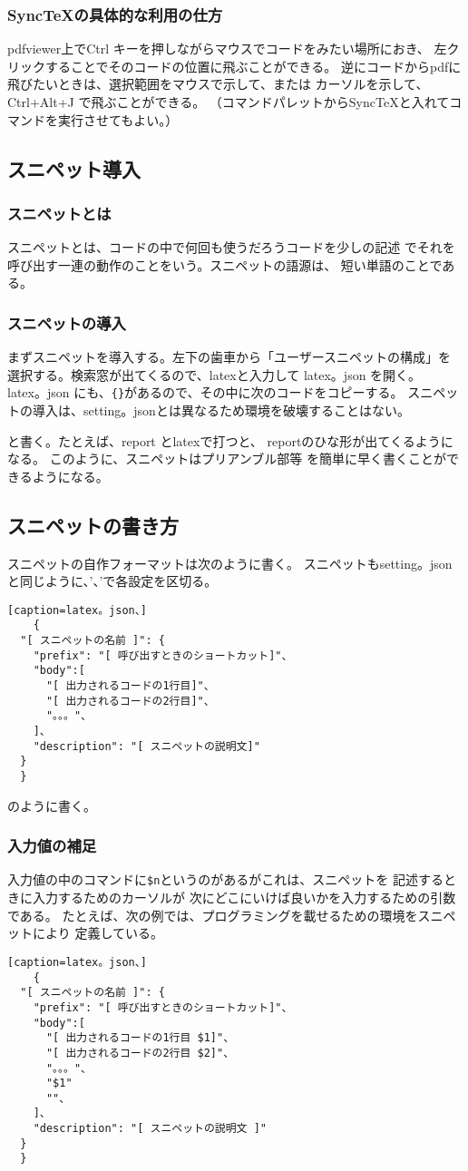 \documentclass{ltjsarticle}
\begin{document}
\subsubsection*{SyncTeXの具体的な利用の仕方}
pdfviewer上でCtrl キーを押しながらマウスでコードをみたい場所におき、
左クリックすることでそのコードの位置に飛ぶことができる。
逆にコードからpdfに飛びたいときは、選択範囲をマウスで示して、または
カーソルを示して、 Ctrl+Alt+J で飛ぶことができる。
（コマンドパレットからSyncTeXと入れてコマンドを実行させてもよい。）

\subsection{スニペット導入}
\subsubsection*{スニペットとは}
スニペットとは、コードの中で何回も使うだろうコードを少しの記述
でそれを呼び出す一連の動作のことをいう。スニペットの語源は、
短い単語のことである。
\subsubsection*{スニペットの導入}
まずスニペットを導入する。左下の歯車から「ユーザースニペットの構成」を
選択する。検索窓が出てくるので、latexと入力して latex。json を開く。
latex。json にも、\verb|{}|があるので、その中に次のコードをコピーする。
スニペットの導入は、setting。jsonとは異なるため環境を破壊することはない。



と書く。たとえば、report とlatexで打つと、
reportのひな形が出てくるようになる。
このように、スニペットはプリアンブル部等
を簡単に早く書くことができるようになる。
\subsection{スニペットの書き方}
スニペットの自作フォーマットは次のように書く。
スニペットもsetting。jsonと同じように、'、'で各設定を区切る。
\begin{verbatim}[caption=latex。json、]
	{
  "[ スニペットの名前 ]": {
    "prefix": "[ 呼び出すときのショートカット]"、
    "body":[
      "[ 出力されるコードの1行目]"、
      "[ 出力されるコードの2行目]"、
      "。。。"、
    ]、
    "description": "[ スニペットの説明文]"
  }
  }
\end{verbatim}
のように書く。
\subsubsection*{入力値の補足}
入力値の中のコマンドに\verb|$n|というのがあるがこれは、スニペットを
記述するときに入力するためのカーソルが
次にどこにいけば良いかを入力するための引数である。
たとえば、次の例では、プログラミングを載せるための環境をスニペットにより
定義している。
\begin{verbatim}[caption=latex。json、]
	{
  "[ スニペットの名前 ]": {
    "prefix": "[ 呼び出すときのショートカット]"、
    "body":[
      "[ 出力されるコードの1行目 $1]"、
      "[ 出力されるコードの2行目 $2]"、
      "。。。"、
      "$1"
      ""、
    ]、
    "description": "[ スニペットの説明文 ]"
  }
  }
\end{verbatim}
\end{document}
